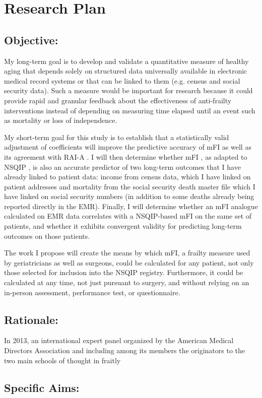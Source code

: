 \section{Research Plan }\label{research-plan}


\subsection{Objective:}\label{objective}
  
My long-term goal is to develop and validate a quantitative measure of healthy aging that depends solely on structured data universally available in electronic medical record systems or that can be linked to them (e.g. census and social security data). Such a measure would be important for research because it could provide rapid and granular feedback about the effectiveness of anti-frailty interventions instead of depending on measuring time elapsed until an event such as mortality or loss of independence. 

My short-term goal for this study is to establish that a statistically valid adjustment of coefficients will improve the predictive accuracy of mFI as well as its agreement with RAI-A \cite{Isharwal_2016,Melin_2015}. I will then determine whether mFI \cite{Rockwood_2005}, as adapted to NSQIP \cite{Tsiouris_2013}, is also an accurate predictor of two long-term outcomes that I have already linked to patient data: income from census data, which I have linked on patient addresses and mortality from the social security death master file which I have linked on social security numbers (in addition to some deaths already being reported directly in the EMR). Finally, I will determine whether an mFI analogue calculated on EMR data correlates with a NSQIP-based mFI on the same set of patients, and whether it exhibits convergent validity for predicting long-term outcomes on those patients. 

The work I propose will create the means by which mFI, a frailty measure used by geriatricians as well as surgeons, could be calculated for any patient, not only those selected for inclusion into the NSQIP registry. Furthermore, it could be calculated at any time, not just pursuant to surgery, and without relying on an in-person assessment, performance test, or questionnaire.

\subsection{Rationale:}\label{rationale}
In 2013, an international expert panel organized by the American Medical Directors Association and including among its members the originators to the two main schools of thought in fraitly 
\subsection{Specific Aims:}\label{specific-aims}
